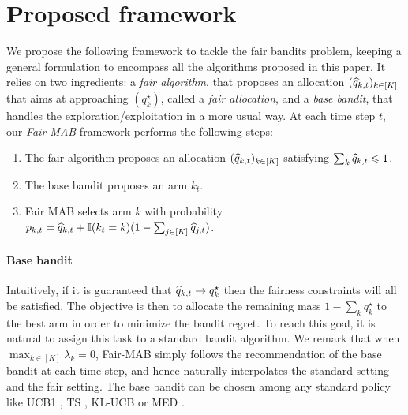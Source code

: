 \section{Proposed framework}

We propose the following framework to tackle the fair bandits problem, keeping a general formulation to encompass all the algorithms proposed in this paper. It relies on two ingredients: a \emph{fair algorithm}, that proposes an allocation $(\widehat{q}_{k,t})_{k\in [K]}$ that aims at approaching $(q_k^\star)$, called a \emph{fair allocation}, and a \emph{base bandit}, that handles the exploration/exploitation in a more usual way. At each time step $t$, our \emph{Fair-MAB} framework performs the following steps:

\begin{enumerate}
\item The fair algorithm proposes an allocation $(\widehat{q}_{k,t})_{k\in [K]}$ satisfying $\sum_k \widehat{q}_{k, t}\leqslant1$.
\item The base bandit proposes an arm $k_t$.
\item Fair MAB selects arm $k$ with probability $p_{k, t}= \widehat{q}_{k,t} + \mathbb{I}(k_t=k)(1-\sum_{j \in [K]}\widehat{q}_{j, t})$.
\end{enumerate}

\paragraph{Base bandit} Intuitively, if it is guaranteed that $\widehat{q}_{k, t} \rightarrow q_k^\star$ then the fairness constraints will all be satisfied. The objective is then to allocate the remaining mass $1-\sum_k q_k^\star$ to the best arm in order to minimize the bandit regret. To reach this goal, it is natural to assign this task to a standard bandit algorithm. We remark that when $\max_{k \in [K]} \lambda_k= 0$, Fair-MAB simply follows the recommendation of the base bandit at each time step, and hence naturally interpolates the standard setting and the fair setting. The base bandit can be chosen among any standard policy like UCB1 \citep{auer2002finite}, TS \citep{TS_1933, TS12AG}, KL-UCB \citep{KL_UCB} or MED \citep{honda11MED, baudry2023general}. %

